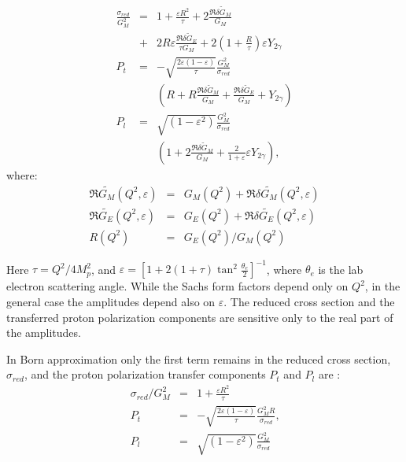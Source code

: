 \begin{eqnarray}
\frac{\sigma _{red}}{G_M^2}&=& 1+\frac{\varepsilon R^2}{\tau }+2\frac{\Re\delta \tilde{G}_M}{G_M} \nonumber \\
&+& 2R\varepsilon \frac{\Re\delta \tilde{G}_E}{\tau G_M}+ 2\left(1+\frac{R}{\tau }\right){ \varepsilon Y_{2\gamma }}
\label{eq:siggen}
\\
P_t&=&-\sqrt{\frac{2\varepsilon(1-\varepsilon)}{\tau}}
\frac{G_M^2}{\sigma _{red}}  \nonumber \\
& &\left(R+
R\frac{ \Re\delta \tilde{G}_M}{G_M}
+\frac{ \Re\delta \tilde{G}_E}{G_M}
+{ Y_{2\gamma }}\right)
\label{eq:ptgen}
\\
P_l&=&\sqrt{(1-\varepsilon ^2)}\frac{G_M^2}{\sigma _{red}} \nonumber \\
& &\left(1+2\frac{ \Re\delta \tilde{G}_M}{G_M}+\frac{2}{1+\varepsilon }{ \varepsilon Y_{2\gamma }}\right)  %
\label{eq:plgen}
\mbox{,}
\end{eqnarray}
where:
\begin{eqnarray}
\Re\tilde{G_M}(Q^2,\varepsilon)&=&G_M(Q^2)+\Re\delta \tilde{G_M}(Q^2,\varepsilon)  \\ %
\label{eq:regm}
\Re\tilde{G_E}(Q^2,\varepsilon)&=&G_E(Q^2)+\Re\delta \tilde{G_E}(Q^2, \varepsilon) 
\label{eq:rege} \\  %
R(Q^2)&=&G_E(Q^2)/G_M(Q^2) \nonumber 
\end{eqnarray}

Here $\tau=Q^{2}/4M_{p}^{2}$, 
and $\varepsilon =[1+2(1+\tau)\tan^2\frac{\theta_e}{2}]^{-1}$,
where  $\theta_e$ is the lab electron scattering angle.
While the Sachs form factors depend only on $Q^2$, in the general case the
amplitudes depend also on $\varepsilon$.
The  reduced cross section
and the transferred proton polarization components are sensitive only to the real part
of the amplitudes. 

In Born approximation only the first term remains in the reduced cross 
section, $\sigma _{red}$, and the
proton polarization transfer components $P_t$ and $P_l$ are :
\begin{eqnarray}
{\sigma _{red}}/{G_M^2}&=&
1+\frac{\varepsilon R^2}{\tau }
\label{eq:sigborn}
\\
P_t&=&-\sqrt{\frac{2\varepsilon(1-\varepsilon)}{\tau}}
\frac{G_M^2R}{\sigma _{red}}
\label{eq:ptborn}
\mbox{,}  \\
P_l&=&\sqrt{(1-\varepsilon ^2)}
\frac{G_M^2}{\sigma _{red}}
\label{eq:pborn}
\end{eqnarray}

